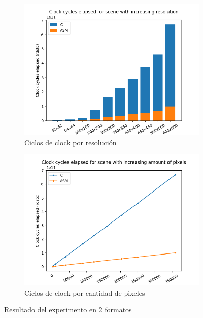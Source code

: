 \begin{figure}
    \centering
    \begin{subfigure}[b]{0.45\textwidth}
        \centering
        \includegraphics[width=\textwidth]{./imgs/exp2-res-bar.png}
        \caption{Ciclos de clock por resolución}
        \label{fig:exp2-res-bar}
    \end{subfigure}
    \hfill
    \begin{subfigure}[b]{0.45\textwidth}
        \centering
        \includegraphics[width=\textwidth]{./imgs/exp2-res-line.png}
        \caption{Ciclos de clock por cantidad de pixeles}
        \label{fig:exp2-res-line}
    \end{subfigure}
    \caption{Resultado del experimento en 2 formatos}
    \label{fig:exp2-res}
\end{figure}

